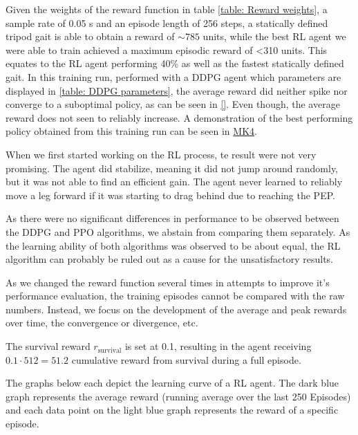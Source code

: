 Given the weights of the reward function in table \ref{table: Reward weights}, a sample rate of 0.05 s and an episode length of 256 steps, a statically defined tripod gait is able to obtain a reward of $\sim785$ units, while the best RL agent we were able to train achieved a maximum episodic reward of <310 units.
This equates to the RL agent performing 40\% as well as the fastest statically defined gait.
In this training run, performed with a DDPG agent which parameters are displayed in \ref{table: DDPG parameters}, the average reward did neither spike nor converge to a suboptimal policy, as can be seen in \ref{}.
Even though, the average reward does not seen to reliably increase.
A demonstration of the best performing policy obtained from this training run can be seen in \hyperref[vid: MK4]{MK4}.

When we first started working on the RL process, te result were not very promising. The agent did stabilize, meaning it did not jump around randomly, but it was not able to find an efficient gain.
The agent never learned to reliably move a leg forward if it was starting to drag behind due to reaching the PEP.


As there were no significant differences in performance to be observed between the DDPG and PPO algorithms, we abstain from comparing them separately.
As the learning ability of both algorithms was observed to be about equal, the RL algorithm can probably  be ruled out as a cause for the unsatisfactory results. 


As we changed the reward function several times in attempts to improve it's performance evaluation, the training episodes cannot be compared with the raw numbers.
Instead, we focus on the development of the average and peak rewards over time, the convergence or divergence, etc.


The survival reward $r_\text{survival}$ is set at 0.1, resulting in the agent receiving $0.1 \cdot 512 = 51.2$ cumulative reward from survival during a full episode.


The graphs below each depict the learning curve of a RL agent. The dark blue graph represents the average reward (running average over the last 250 Episodes) and each data point on the light blue graph represents the reward of a specific episode.


